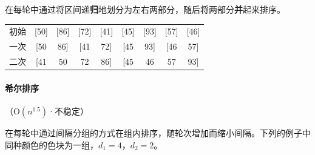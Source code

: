 \documentclass[UTF8]{ctexart}
\renewcommand\O{\mathrm{O}}
\begin{document}
在每轮中通过将区间递\textcolor{color2}{\textbf{归}}地划分为左右两部分，随后将两部分\textcolor{color2}{\textbf{并}}起来排序。

\begin{table}[H]
  \centering
  \begin{tabular}{ccccccccc}
    初始 &[50] & [86] & [72] & [41] & [45] & [93] & [57] & [46] \\
    一次 &[50 & 86] & [41 & 72] & [45 & 93] & [46 & 57] \\
    二次 &[41 & 50 & 72 & 86] & [45 & 46 & 57 & 93] \\
  \end{tabular}
\end{table}

\renewcommand\sort[1]{\colorbox{color3b}{\textcolor{color3}{#1}}}
\paragraph{\textcolor{color3}{希尔排序}} {\small\textcolor{color3}{（$\O(n^{1.5})$·不稳定）}}

在每轮中通过间隔分组的方式在组内排序，随轮次增加而缩小间隔。下列的例子中同种颜色的色块为一组，$d_1=4$，$d_2=2$。

\newpage
{}
\BgThispage
\end{document}
